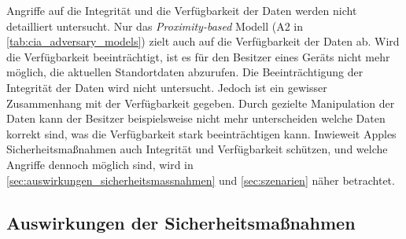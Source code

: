 Angriffe auf die Integrität und die Verfügbarkeit der Daten werden \cite{Heinrich_FindMy} nicht detailliert untersucht.
Nur das \textit{Proximity-based} Modell (A2 in \autoref{tab:cia_adversary_models}) zielt auch auf die Verfügbarkeit der Daten ab.
Wird die Verfügbarkeit beeinträchtigt, ist es für den Besitzer eines Geräts nicht mehr möglich, die aktuellen Standortdaten abzurufen.
Die Beeinträchtigung der Integrität der Daten wird nicht untersucht.
Jedoch ist ein gewisser Zusammenhang mit der Verfügbarkeit gegeben.
Durch gezielte Manipulation der Daten kann der Besitzer beispielsweise nicht mehr unterscheiden welche Daten korrekt sind, was die Verfügbarkeit stark beeinträchtigen kann.
Inwieweit Apples Sicherheitsmaßnahmen auch Integrität und Verfügbarkeit schützen, und welche Angriffe dennoch möglich sind, wird in \autoref{sec:auswirkungen_sicherheitsmassnahmen} und \autoref{sec:szenarien} näher betrachtet.


\subsection{Auswirkungen der Sicherheitsmaßnahmen}
\label{sec:auswirkungen_sicherheitsmassnahmen}

